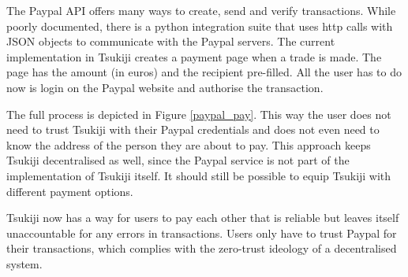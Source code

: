\newpage
The Paypal API \cite{paypal} offers many ways to create, send and verify transactions.
While poorly documented, there is a python integration suite that uses http calls with JSON objects to communicate with the Paypal servers.
The current implementation in Tsukiji creates a payment page when a trade is made.
The page has the amount (in euros) and the recipient pre-filled.
All the user has to do now is login on the Paypal website and authorise the transaction.

The full process is depicted in Figure \ref{paypal_pay}.
This way the user does not need to trust Tsukiji with their Paypal credentials and does not even need to know the address of the person they are about to pay.
This approach keeps Tsukiji decentralised as well, since the Paypal service is not part of the implementation of Tsukiji itself.
It should still be possible to equip Tsukiji with different payment options.

Tsukiji now has a way for users to pay each other that is reliable but leaves itself unaccountable for any errors in transactions.
Users only have to trust Paypal for their transactions, which complies with the zero-trust ideology of a decentralised system.
